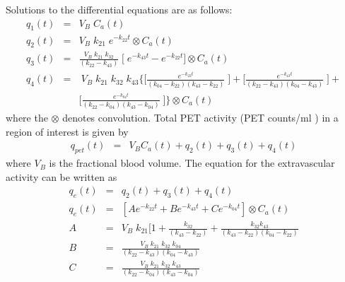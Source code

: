\documentclass[11pt]{article}    %
\begin{document}
  Solutions to the differential equations are  as follows:
\vspace {0.15in}
\begin {eqnarray}
  q_{1}(t) & =  & V_{B} \; C_{a}(t)   \\
  q_{2}(t) & =  & V_{B}\;  k_{21} \;e^{- k_{22} t}  \otimes C_{a}(t)  \\
 q_{3}(t) & = &  \frac { V_{B}\;   k_{21}\; k_{32}}{(k_{22} - k_{43})} \;
 \bigl [ \;  e ^{-k_{43} t} - e ^{-k_{22} t} \bigr ] \otimes C_{a}(t)  \\
 q_{4}(t) & = &  \ V_{B}\; k_{21}\; k_{32}\; k_{43} \Biggl \{  \biggl [
\frac  { e ^{-k_{22} t} } { (k_{04} - k_{22}) (k_{43} - k_{22}) }  \; \biggr ] +
\biggl [ \frac {e ^{-k_{43} t} } {(k_{22} - k_{43}) (k_{04} - k_{43})} \; \biggr ] + \nonumber \\ 
& & \biggl [ \frac {e ^{-k_{04} t} } {(k_{22} - k_{04}) (k_{43} - k_{04})} \; \biggr ]
    \Biggr \}  \otimes C_{a}(t)   
\end {eqnarray}
 where the $\otimes$  denotes convolution.
   Total PET activity (PET counts/ml ) in a region of interest is
given by 
\begin {eqnarray}
  q_{pet}(t)  & = & V_{B}C_{a}(t)  + q_{2}(t) + q_{3}(t)  +  q_{4}(t)
\end {eqnarray}
where  $V_{B}$ is the fractional blood volume.  
\newpage
   The equation for the  extravascular activity can be written as
\begin {eqnarray}
q_{e}(t)  & =  &  q_{2}(t) + q_{3}(t)  +  q_{4}(t) \\
q_{e}(t)  & =  &   [ A  e ^{-k_{22} t} + B e ^{-k_{43} t} + C e ^{-k_{04} t}] \otimes C_{a}(t) \\
 A  & =  &  V_{B}\;  k_{21} \biggl [ 1 +  \frac {k_{32}  } {(k_{43} - k_{22})}
 + \frac {k_{32}  k_{43} }  {(k_{43} - k_{22})  (k_{04} - k_{22}) }  \\
  B  & =  &   \frac { V_{B} \; k_{21}\; k_{32} \; k_{04} } {(k_{22} - k_{43}) (k_{04} - k_{43}) } \\
  C   & =  &  \frac { V_{B} \; k_{21} \; k_{32} \;k_{43}} {(k_{22} - k_{04}) (k_{43} - k_{04})} 
\end {eqnarray}
\end{document}
